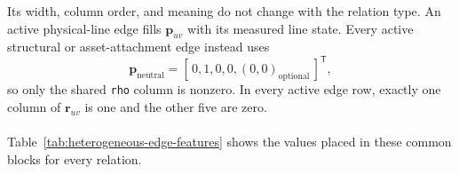 Its width, column order, and meaning do not change with the relation type. An
active physical-line edge fills \(\mathbf{p}_{uv}\) with its measured line
state. Every active structural or asset-attachment edge instead uses
\begin{equation}
  \mathbf{p}_{\mathrm{neutral}}
  = [\,0,1,0,0,(0,0)_{\mathrm{optional}}\,]^{\mathsf T},
  \label{eq:heterogeneous-neutral-edge-physical-block}
\end{equation}
so only the shared \texttt{rho} column is nonzero. In every active edge row,
exactly one column of \(\mathbf{r}_{uv}\) is one and the other five are zero.\\
\\
Table~\ref{tab:heterogeneous-edge-features} shows the values placed in these
common blocks for every relation.

